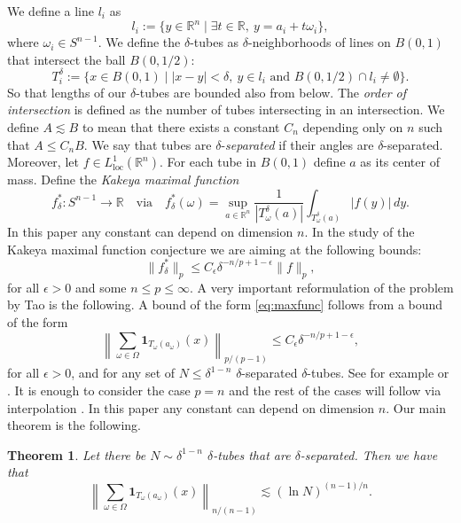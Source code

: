 \documentclass[11pt, letterpaper]{nyjm}
\newtheorem{theorem}{Theorem}[section]
\newcommand{\R}{\mathbb{R}}
\begin{document}
We define a line $l_i$ as
\[
l_i := \{ y \in \R^n \mid \exists t \in \R,\ y = a_i + t\omega_i \},
\]
where $\omega_i \in S^{n-1}.$
We define the $\delta$-tubes as $\delta$-neighborhoods of lines on $B(0,1)$ that
intersect the ball $B(0, 1/2)$:
\[
T^{\delta}_i := \{ x \in B(0,1) \mid |x - y| < \delta,\ y \in l_i
\text{ and } B(0,1/2) \cap l_i \neq \emptyset \}.
\]
So that lengths of our $\delta$-tubes are bounded also from below. The
\emph{order of intersection} is defined as the number of tubes intersecting in an
intersection. We define $A \lesssim B$ to mean that there exists a constant $C_n$
depending only on $n$ such that $A \leq C_n B$. We say that tubes are
$\delta$-\emph{separated} if their angles are $\delta$-separated. Moreover, let
$f \in L^1_{\mathrm{loc}}(\R^n)$. For each tube in $B(0,1)$ define $a$ as its
center of mass. Define the \emph{Kakeya maximal function}
\[
f^*_\delta : S^{n-1} \to \R \quad \text{via} \quad
f^*_\delta(\omega) = \sup_{a \in \R^n} \frac{1}{|T^{\delta}_\omega(a)|}
\int_{T^{\delta}_\omega(a)} |f(y)|\, dy.
\]
In this paper any constant can depend on dimension $n$. In the study of the Kakeya
maximal function conjecture we are aiming at the following bounds:
\begin{equation}\label{eq:maxfunc}
	\| f^*_\delta \|_p \leq C_\epsilon \delta^{-n/p + 1 - \epsilon} \| f \|_p,
\end{equation}
for all $\epsilon > 0$ and some $n \leq p \leq \infty$. A very important
reformulation of the problem by Tao is the following. A bound of the form
\eqref{eq:maxfunc} follows from a bound of the form
\begin{equation}\label{eq:tao}
	\left\| \sum_{\omega \in \Omega} \mathbf{1}_{T_\omega(a_\omega)}(x) \right\|_{p/(p-1)}
	\leq C_\epsilon \delta^{-n/p + 1 - \epsilon},
\end{equation}
for all $\epsilon > 0$, and for any set of $N \leq \delta^{1-n}$ $\delta$-separated
$\delta$-tubes. See for example \cite{Kroc} or \cite{Tao99}. It is enough to
consider the case $p = n$ and the rest of the cases will follow via interpolation
\cite{Kroc, Tao99}. In this paper any constant can depend on dimension $n$. Our
main theorem is the following.

\begin{theorem}\label{thm:main}
	Let there be $N \sim \delta^{1-n}$ $\delta$-tubes that are $\delta$-separated.
	Then we have that
	\[
	\left\| \sum_{\omega \in \Omega} \mathbf{1}_{T_\omega(a_\omega)}(x)
	\right\|_{n/(n-1)} \lesssim (\ln N)^{(n-1)/n}.
	\]
\end{theorem}
\end{document}
